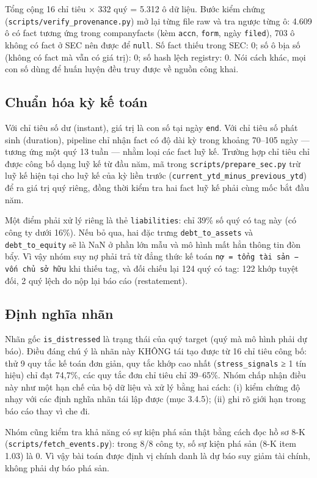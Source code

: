 \documentclass[13pt,a4paper]{extreport}
\begin{document}
Tổng cộng 16 chỉ tiêu × 332 quý = 5.312 ô dữ liệu. Bước kiểm chứng (\texttt{scripts/verify\_provenance.py}) mở lại từng file raw và tra ngược từng ô: 4.609 ô có fact tương ứng trong companyfacts (kèm \texttt{accn}, \texttt{form}, ngày \texttt{filed}), 703 ô không có fact ở SEC nên được để \texttt{null}. Số fact thiếu trong SEC: 0; số ô bịa số (không có fact mà vẫn có giá trị): 0; số hash lệch registry: 0. Nói cách khác, mọi con số dùng để huấn luyện đều truy được về nguồn công khai.

\subsection{Chuẩn hóa kỳ kế toán}

Với chỉ tiêu số dư (instant), giá trị là con số tại ngày \texttt{end}. Với chỉ tiêu số phát sinh (duration), pipeline chỉ nhận fact có độ dài kỳ trong khoảng 70–105 ngày — tương ứng một quý 13 tuần — nhằm loại các fact luỹ kế. Trường hợp chỉ tiêu chỉ được công bố dạng luỹ kế từ đầu năm, mã trong \texttt{scripts/prepare\_sec.py} trừ luỹ kế hiện tại cho luỹ kế của kỳ liền trước (\texttt{current\_ytd\_minus\_previous\_ytd}) để ra giá trị quý riêng, đồng thời kiểm tra hai fact luỹ kế phải cùng mốc bắt đầu năm.

Một điểm phải xử lý riêng là thẻ \texttt{liabilities}: chỉ 39\% số quý có tag này (có công ty dưới 16\%). Nếu bỏ qua, hai đặc trưng \texttt{debt\_to\_assets} và \texttt{debt\_to\_equity} sẽ là NaN ở phần lớn mẫu và mô hình mất hẳn thông tin đòn bẩy. Vì vậy nhóm suy nợ phải trả từ đẳng thức kế toán \texttt{nợ = tổng tài sản − vốn chủ sở hữu} khi thiếu tag, và đối chiếu lại 124 quý có tag: 122 khớp tuyệt đối, 2 quý lệch do nộp lại báo cáo (restatement).

\subsection{Định nghĩa nhãn}

Nhãn gốc \texttt{is\_distressed} là trạng thái của quý target (quý mà mô hình phải dự báo). Điều đáng chú ý là nhãn này KHÔNG tái tạo được từ 16 chỉ tiêu công bố: thử 9 quy tắc kế toán đơn giản, quy tắc khớp cao nhất (\texttt{stress\_signals} ≥ 1 tín hiệu) chỉ đạt 74,7\%, các quy tắc đơn chỉ tiêu chỉ 39–65\%. Nhóm chấp nhận điều này như một hạn chế của bộ dữ liệu và xử lý bằng hai cách: (i) kiểm chứng độ nhạy với các định nghĩa nhãn tái lập được (mục 3.4.5); (ii) ghi rõ giới hạn trong báo cáo thay vì che đi.

Nhóm cũng kiểm tra khả năng có sự kiện phá sản thật bằng cách đọc hồ sơ 8-K (\texttt{scripts/fetch\_events.py}): trong 8/8 công ty, số sự kiện phá sản (8-K item 1.03) là 0. Vì vậy bài toán được định vị chính danh là dự báo suy giảm tài chính, không phải dự báo phá sản.
\end{document}

